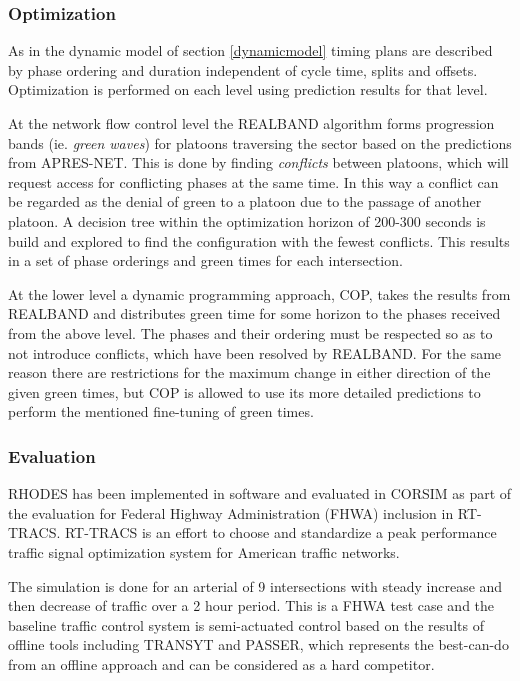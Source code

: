 \subsubsection*{Optimization}
As in the dynamic model of section \ref{dynamicmodel} timing plans are described by phase ordering and duration independent of cycle time, splits and offsets. 
Optimization is performed on each level using prediction results for that level.

At the network flow control level the REALBAND algorithm forms progression bands (ie. \textit{green waves}) for platoons traversing the sector based on the predictions from APRES-NET. This is done by finding \textit{conflicts} between platoons, which will request access for conflicting phases at the same time. In this way a conflict can be regarded as the denial of green to a platoon due to the passage of another platoon. A decision tree within the optimization horizon of 200-300 seconds is build and explored to find the configuration with the fewest conflicts. This results in a set of phase orderings and green times for each intersection.

At the lower level a dynamic programming approach, COP, takes the results from REALBAND and distributes green time for some horizon to the phases received from the above level. The phases and their ordering must be respected so as to not introduce conflicts, which have been resolved by REALBAND. For the same reason there are restrictions for the maximum change in either direction of the given green times, but COP is allowed to use its more detailed predictions to perform the mentioned fine-tuning of green times.

\subsubsection*{Evaluation}
RHODES has been implemented in software and evaluated in CORSIM as part of the evaluation for Federal Highway Administration (FHWA) inclusion in RT-TRACS. RT-TRACS is an effort to choose and standardize a peak performance traffic signal optimization system for American traffic networks.

The simulation is done for an arterial of 9 intersections with steady increase and then decrease of traffic over a 2 hour period. This is a FHWA test case and the baseline traffic control system is semi-actuated control based on the results of offline tools including TRANSYT and PASSER, which represents the best-can-do from an offline approach and can be considered as a hard competitor. 

